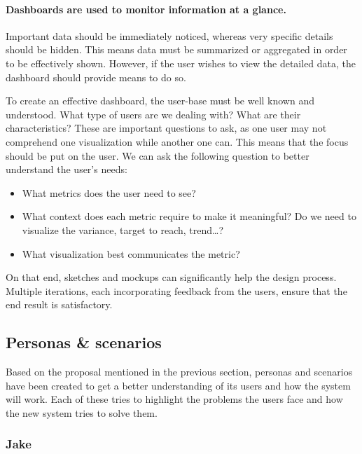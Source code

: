     \paragraph{Dashboards are used to monitor information at a glance.} Important data should be immediately noticed, whereas very specific details should be hidden. This means data must be summarized or aggregated in order to be effectively shown. However, if the user wishes to view the detailed data, the dashboard should provide means to do so.\bigskip

    \noindent To create an effective dashboard, the user-base must be well known and understood. What type of users are we dealing with? What are their characteristics? These are important questions to ask, as one user may not comprehend one visualization while another one can. This means that the focus should be put on the user\cite{brath2004dashboard}. We can ask the following question to better understand the user's needs:
    
    \begin{itemize}
        \item What metrics does the user need to see?
        \item What context does each metric require to make it meaningful? Do we need to visualize the variance, target to reach, trend\ldots?
        \item What visualization best communicates the metric?
    \end{itemize}

    \noindent On that end, sketches and mockups can significantly help the design process. Multiple iterations, each incorporating feedback from the users, ensure that the end result is satisfactory.

    \subsection{Personas \& scenarios}\label{3_personas_scenarios}

    Based on the proposal mentioned in the previous section, personas and scenarios have been created to get a better understanding of its users and how the system will work. Each of these tries to highlight the problems the users face and how the new system tries to solve them.

        \subsubsection{Jake}


